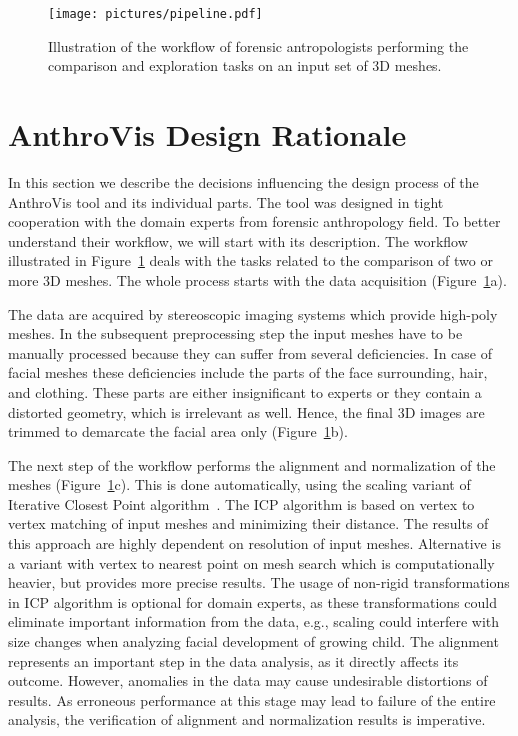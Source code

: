 \documentclass[final,5p,times]{elsarticle}
\begin{document}
\begin{figure}[tbh]
	\centering
  \texttt{[image: pictures/pipeline.pdf]}
  \caption{\label{fig:pipeline} Illustration of the workflow of forensic antropologists performing the comparison and exploration tasks on an input set of 3D meshes.}
	\vspace{-2mm}
\end{figure}

\section{AnthroVis Design Rationale} \label{overview}
In this section we describe the decisions influencing the design process of the AnthroVis tool and its individual parts.
The tool was designed in tight cooperation with the domain experts from forensic anthropology field.
To better understand their workflow, we will start with its description.
The workflow illustrated in Figure~\ref{fig:pipeline} deals with the tasks related to the comparison of two or more 3D meshes.
The whole process starts with the data acquisition (Figure~\ref{fig:pipeline}a).

The data are acquired by stereoscopic imaging systems which provide high-poly meshes. 
In the subsequent preprocessing step the input meshes have to be manually processed because they can suffer from several deficiencies. 
In case of facial meshes these deficiencies include the parts of the face surrounding, hair, and clothing.
These parts are either insignificant to experts or they contain a distorted geometry, which is irrelevant as well. 
Hence, the final 3D images are trimmed to demarcate the facial area only (Figure~\ref{fig:pipeline}b).

The next step of the workflow performs the alignment and normalization of the meshes (Figure~\ref{fig:pipeline}c). 
This is done automatically, using the scaling variant of Iterative Closest Point algorithm~\cite{besl1992method, du2010scaling}. 
The ICP algorithm is based on vertex to vertex matching of input meshes and  minimizing their distance.
The results of this approach are highly dependent on resolution of input meshes.
Alternative is a variant with vertex to nearest point on mesh search which is computationally heavier, but provides more precise results.
The usage of non-rigid transformations in ICP algorithm is optional for domain experts, as these transformations could eliminate important information from the data, e.g., scaling could interfere with size changes when analyzing facial development of growing child.
The alignment represents an important step in the data analysis, as it directly affects its outcome.
However, anomalies in the data may cause undesirable distortions of results. 
As erroneous performance at this stage may lead to failure of the entire analysis, the verification of alignment and normalization results is imperative.
\end{document}
